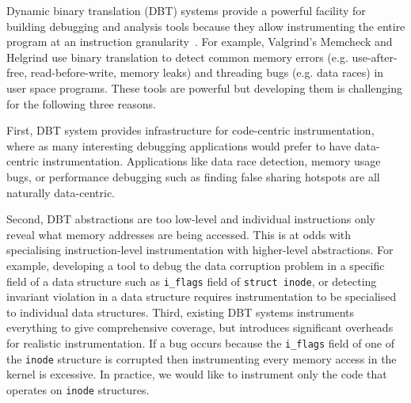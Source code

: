 \documentclass[letterpaper,twocolumn,10pt]{article}
\begin{document}
Dynamic binary translation (DBT) systems provide a powerful facility for building debugging and analysis tools because they allow instrumenting the entire program at an instruction granularity~\cite{DynamoRIOKernel}. For example, Valgrind's Memcheck \cite{Seward:2005:UVD:1247360.1247362} and Helgrind \cite{Muehlenfeld:2007:FDM:1229428.1229457} use binary translation to detect common memory errors (e.g. use-after-free, read-before-write, memory leaks) and threading bugs (e.g. data races) in user space programs. These tools are powerful but developing them is challenging for the following three reasons.

First, DBT system provides infrastructure for code-centric instrumentation, where as many interesting debugging applications would prefer to have data-centric instrumentation. Applications like data race detection, memory usage bugs, or performance debugging such as finding false sharing hotspots are all naturally data-centric.

Second, DBT abstractions are too low-level and individual instructions only reveal what memory addresses are being accessed. This is at odds with specialising instruction-level instrumentation with higher-level abstractions. For example, developing a tool to debug the data corruption problem in a specific field of a data structure such as \texttt{i\_flags} field of \texttt{struct inode}, or detecting invariant violation in a data structure requires instrumentation to be specialised to individual data structures.
Third, existing DBT systems instruments everything to give comprehensive coverage, but introduces significant overheads for realistic instrumentation. If a bug occurs because the \texttt{i\_flags} field of one of the \texttt{inode} structure is corrupted then instrumenting every memory access in the kernel is excessive. In practice, we would like to instrument only the code that operates on \texttt{inode} structures.
\end{document}
